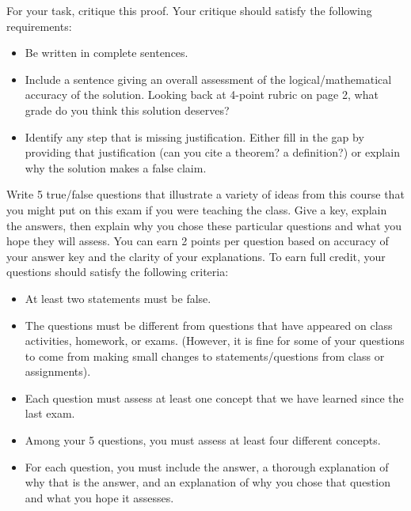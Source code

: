 \documentclass[11pt,addpoints,letterpaper]{exam}
\begin{document}
\begin{questions}
\begin{parts}
For your task, critique this proof.  Your critique should satisfy the following requirements:
\begin{itemize}
\item Be written in complete sentences.
\item Include a sentence giving an overall assessment of the logical/mathematical accuracy of the solution.  Looking back at 4-point rubric on page 2, what grade do you think this solution deserves?
\item Identify any step that is missing justification. Either fill in the gap by providing that justification (can you cite a theorem? a definition?) or explain why the solution makes a false claim.  
\end{itemize}

\end{parts}
\vfill
\newpage
\question[10] Write 5 true/false questions that illustrate a variety of ideas from this course that you might put on this exam if you were teaching the class. Give a key, explain the answers, then explain why you chose these particular questions and what you hope they will assess. You can earn 2 points per question based on accuracy of your answer key and the clarity of your explanations.
To earn full credit, your questions should satisfy the following criteria:
\begin{itemize}
\item At least two statements must be false.
\item The questions must be different from questions that have appeared on class activities, homework, or exams. (However, it is fine for some of your questions to come from making small changes to statements/questions from class or assignments).
\item Each question must assess at least one concept that we have learned since the last exam. 
\item Among your 5 questions, you must assess at least four different concepts. 
\item For each question, you must include the answer, a thorough explanation of why that is the answer, and an explanation of why you chose that question and what you hope it assesses. 
\end{itemize}

\vfill
{}
\end{questions}
\end{document}
